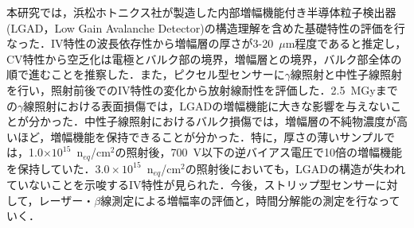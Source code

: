 
\begin{jabstract}
本研究では，浜松ホトニクス社が製造した内部増幅機能付き半導体粒子検出器(LGAD，Low Gain Avalanche Detector)の構造理解を含めた基礎特性の評価を行なった．IV特性の波長依存性から増幅層の厚さが3-20~$\mu$m程度であると推定し，CV特性から空乏化は電極とバルク部の境界，増幅層との境界，バルク部全体の順で進むことを推察した．また，ピクセル型センサーに$\gamma$線照射と中性子線照射を行い，照射前後でのIV特性の変化から放射線耐性を評価した．2.5~MGyまでの$\gamma$線照射における表面損傷では，LGADの増幅機能に大きな影響を与えないことが分かった．中性子線照射におけるバルク損傷では，増幅層の不純物濃度が高いほど，増幅機能を保持できることが分かった．特に，厚さの薄いサンプルでは，1.0$\times10^{15}$~n$_{eq}$/cm$^{2}$の照射後，700~V以下の逆バイアス電圧で10倍の増幅機能を保持していた．$3.0\times10^{15}$~n$_{eq}$/cm$^{2}$の照射後においても，LGADの構造が失われていないことを示唆するIV特性が見られた．今後，ストリップ型センサーに対して，レーザー・$\beta$線測定による増幅率の評価と，時間分解能の測定を行なっていく．
\end{jabstract}
